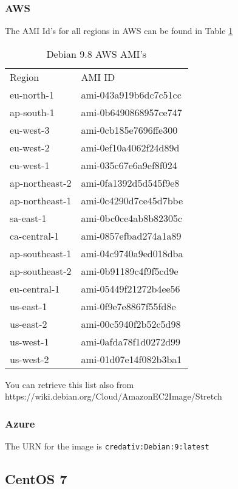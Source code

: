 \subsubsection{AWS}

The AMI Id's for all regions in AWS can be found in Table \ref{debami}

\begin{table}[]
\centering
\begin{tabular}{ll}
Region         & AMI ID                \\
eu-north-1     & ami-043a919b6dc7c51cc \\
ap-south-1     & ami-0b6490868957ce747 \\
eu-west-3      & ami-0cb185e7696ffe300 \\
eu-west-2      & ami-0ef10a4062f24d89d \\
eu-west-1      & ami-035c67e6a9ef8f024 \\
ap-northeast-2 & ami-0fa1392d5d545f9e8 \\
ap-northeast-1 & ami-0c4290d7ce45d7bbe \\
sa-east-1      & ami-0bc0ce4ab8b82305c \\
ca-central-1   & ami-0857efbad274a1a89 \\
ap-southeast-1 & ami-04c9740a9ed018dba \\
ap-southeast-2 & ami-0b91189c4f9f5cd9e \\
eu-central-1   & ami-05449f21272b4ee56 \\
us-east-1      & ami-0f9e7e8867f55fd8e \\
us-east-2      & ami-00c5940f2b52c5d98 \\
us-west-1      & ami-0afda78f1d0272d99 \\
us-west-2      & ami-01d07e14f082b3ba1
\end{tabular}
\caption{Debian 9.8 AWS AMI's}
\label{debami}
\end{table}

You can retrieve this list also from https://wiki.debian.org/Cloud/AmazonEC2Image/Stretch

\subsubsection{Azure}

The URN for the image is \texttt{credativ:Debian:9:latest}

\subsection{CentOS 7}

